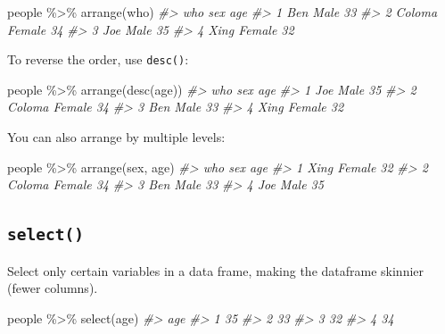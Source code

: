 \documentclass[
]{book}
\newenvironment{Shaded}{\begin{snugshade}}{\end{snugshade}}
\newcommand{\CommentTok}[1]{\textcolor[rgb]{0.56,0.35,0.01}{\textit{#1}}}
\newcommand{\FunctionTok}[1]{\textcolor[rgb]{0.00,0.00,0.00}{#1}}
\newcommand{\NormalTok}[1]{#1}
\newcommand{\SpecialCharTok}[1]{\textcolor[rgb]{0.00,0.00,0.00}{#1}}
\begin{document}
\begin{Shaded}
\begin{Highlighting}[]
\NormalTok{people }\SpecialCharTok{\%\textgreater{}\%} \FunctionTok{arrange}\NormalTok{(who)}
\CommentTok{\#\textgreater{}      who    sex age}
\CommentTok{\#\textgreater{} 1    Ben   Male  33}
\CommentTok{\#\textgreater{} 2 Coloma Female  34}
\CommentTok{\#\textgreater{} 3    Joe   Male  35}
\CommentTok{\#\textgreater{} 4   Xing Female  32}
\end{Highlighting}
\end{Shaded}

To reverse the order, use \texttt{desc()}:

\begin{Shaded}
\begin{Highlighting}[]
\NormalTok{people }\SpecialCharTok{\%\textgreater{}\%} \FunctionTok{arrange}\NormalTok{(}\FunctionTok{desc}\NormalTok{(age))}
\CommentTok{\#\textgreater{}      who    sex age}
\CommentTok{\#\textgreater{} 1    Joe   Male  35}
\CommentTok{\#\textgreater{} 2 Coloma Female  34}
\CommentTok{\#\textgreater{} 3    Ben   Male  33}
\CommentTok{\#\textgreater{} 4   Xing Female  32}
\end{Highlighting}
\end{Shaded}

You can also arrange by multiple levels:

\begin{Shaded}
\begin{Highlighting}[]
\NormalTok{people }\SpecialCharTok{\%\textgreater{}\%} \FunctionTok{arrange}\NormalTok{(sex, age)}
\CommentTok{\#\textgreater{}      who    sex age}
\CommentTok{\#\textgreater{} 1   Xing Female  32}
\CommentTok{\#\textgreater{} 2 Coloma Female  34}
\CommentTok{\#\textgreater{} 3    Ben   Male  33}
\CommentTok{\#\textgreater{} 4    Joe   Male  35}
\end{Highlighting}
\end{Shaded}

\hypertarget{select}{%
\subsection*{\texorpdfstring{\texttt{select()}}{select()}}\label{select}}

Select only certain variables in a data frame, making the dataframe skinnier (fewer columns).

\begin{Shaded}
\begin{Highlighting}[]
\NormalTok{people }\SpecialCharTok{\%\textgreater{}\%} \FunctionTok{select}\NormalTok{(age)}
\CommentTok{\#\textgreater{}   age}
\CommentTok{\#\textgreater{} 1  35}
\CommentTok{\#\textgreater{} 2  33}
\CommentTok{\#\textgreater{} 3  32}
\CommentTok{\#\textgreater{} 4  34}
\end{Highlighting}
\end{Shaded}
\end{document}
